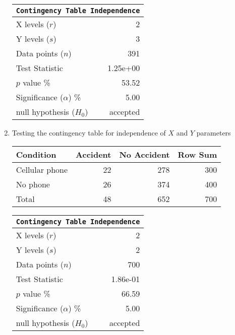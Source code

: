 \begin{enumerate}
\begin{table}[H]
	\end{table}
	\bigskip
	\begin{table}[H]
		\centering
		\begin{tabular}{@{}lr@{}}
			\toprule
			\multicolumn{2}{c}{\texttt{Contingency Table Independence}} \\
			\midrule
			X levels ($r$)             &         2 \\
			Y levels ($s$)             &         3 \\
			Data points ($n$)          &       391 \\
			Test Statistic             &  1.25e+00 \\
			$p$ value \%               &     53.52 \\
			Significance ($\alpha$) \% &      5.00 \\
			null hypothesis ($H_0$)    &  accepted \\
			\bottomrule
		\end{tabular}
		
	\end{table}
	\bigskip
	
	\item Testing the contingency table for independence of $ X $ and $ Y $ parameters
	
	\begin{table}[H]
		\centering
		\begin{tabular}{lrrr}
			\toprule
			Condition &   Accident &   No Accident &  Row Sum \\
			\midrule
			Cellular phone &         22 &           278 &      300 \\
			No phone       &         26 &           374 &      400 \\
			\midrule
			Total          &         48 &           652 &      700 \\
			\bottomrule
		\end{tabular}
		
	\end{table}
	\bigskip
	\begin{table}[H]
		\centering
		\begin{tabular}{@{}lr@{}}
			\toprule
			\multicolumn{2}{c}{\texttt{Contingency Table Independence}} \\
			\midrule
			X levels ($r$)             &         2 \\
			Y levels ($s$)             &         2 \\
			Data points ($n$)          &       700 \\
			Test Statistic             &  1.86e-01 \\
			$p$ value \%               &     66.59 \\
			Significance ($\alpha$) \% &      5.00 \\
			null hypothesis ($H_0$)    &  accepted \\
			\bottomrule
		\end{tabular}
		

\end{table}
\end{enumerate}
